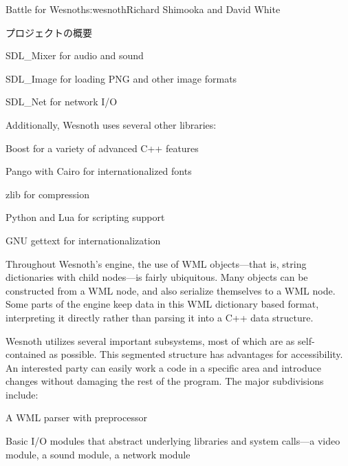 \begin{aosachapter}{Battle for Wesnoth}{s:wesnoth}{Richard Shimooka and David White}
\begin{aosasect1}{プロジェクトの概要}
\begin{aosaitemize}

  \item SDL\_Mixer for audio and sound

  \item SDL\_Image for loading PNG and other image formats

  \item SDL\_Net for network I/O

\end{aosaitemize}

Additionally, Wesnoth uses several other libraries:

\begin{aosaitemize}

  \item Boost for a variety of advanced C++ features

  \item Pango with Cairo for internationalized fonts

  \item zlib for compression

  \item Python and Lua for scripting support

  \item GNU gettext for internationalization

\end{aosaitemize}

Throughout Wesnoth's engine, the use of WML objects---that is, string
dictionaries with child nodes---is fairly ubiquitous.  Many objects
can be constructed from a WML node, and also serialize themselves to a
WML node. Some parts of the engine keep data in this WML dictionary
based format, interpreting it directly rather than parsing it into a
C++ data structure.

Wesnoth utilizes several important subsystems, most of which are as
self-contained as possible. This segmented structure has advantages
for accessibility. An interested party can easily work a code in a
specific area and introduce changes without damaging the rest of the
program. The major subdivisions include:

\begin{aosaitemize}

  \item A WML parser with preprocessor

  \item Basic I/O modules that abstract underlying libraries and
  system calls---a video module, a sound module, a network module


\end{aosaitemize}
\end{aosasect1}
\end{aosachapter}
